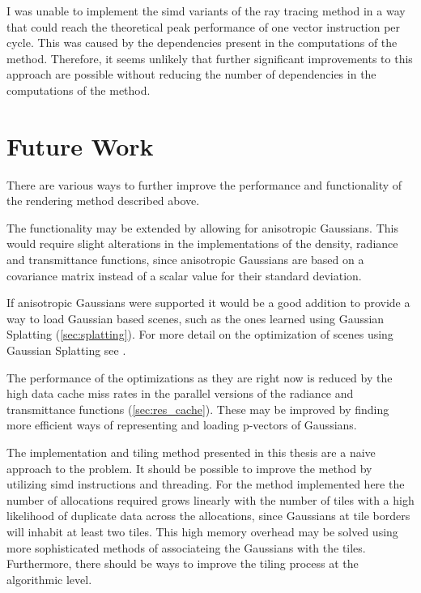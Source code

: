 \documentclass[a4paper, 11pt]{memoir}
\begin{document}
    I was unable to implement the \gls{simd} variants of the ray tracing method in a way that could reach the
    theoretical peak performance of one vector instruction per cycle. This was caused by the dependencies present in the
    computations of the method. Therefore, it seems unlikely that further significant improvements to this approach are
    possible without reducing the number of dependencies in the computations of the method.

    \section{Future Work}
    \label{sec:future_work}
    There are various ways to further improve the performance and functionality of the rendering method described above.

    The functionality may be extended by allowing for anisotropic Gaussians. This would require slight alterations in the
    implementations of the density, \gls{radiance} and \gls{transmittance} functions, since anisotropic Gaussians are
    based on a covariance matrix instead of a scalar value for their standard deviation.

    If anisotropic Gaussians were supported it would be a good addition to provide a way to load Gaussian based scenes,
    such as the ones learned using Gaussian Splatting (\ref{sec:splatting}). For more detail on the optimization of
    scenes using Gaussian Splatting see \cite{kerbl3Dgaussians}.

    The performance of the optimizations as they are right now is reduced by the high data cache miss rates in the parallel
    versions of the \gls{radiance} and \gls{transmittance} functions (\ref{sec:res_cache}). These may be improved by
    finding more efficient ways of representing and loading p-vectors of Gaussians.

    The implementation and tiling method presented in this thesis are a naive approach to the problem. It should be possible
    to improve the method by utilizing \gls{simd} instructions and threading. For the method implemented here the number
    of allocations required grows linearly with the number of tiles with a high likelihood of duplicate data across the
    allocations, since Gaussians at tile borders will inhabit at least two tiles. This high memory overhead may be solved
    using more sophisticated methods of associateing the Gaussians with the tiles. Furthermore, there should be ways to
    improve the tiling process at the algorithmic level.
\end{document}
